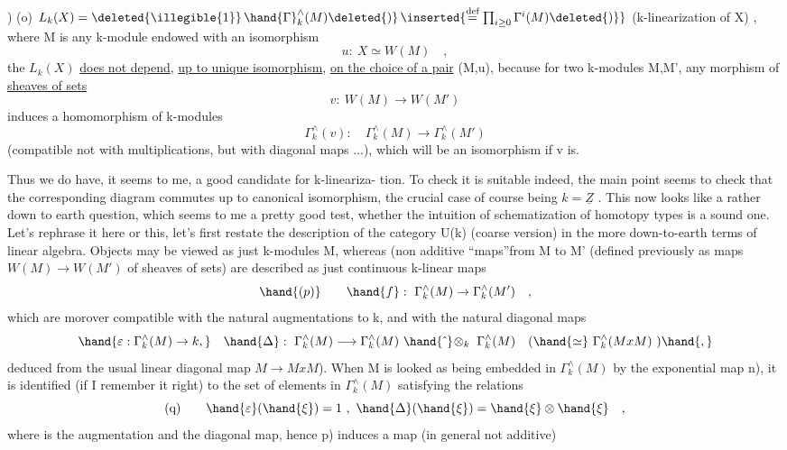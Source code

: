 
)
(o) \qquad $L_k(X) = \deleted{\illegible{1}}\,\hand{\Gamma}_k^{\wedge}(M)\deleted{)}\,\inserted{\overset{\text{def}}{=}\prod_{i\geq 0}\Gamma^{i}(M)\deleted{)}}$ \hand{(}(k-linearization of X) ,
where M is any k-module endowed with an isomorphism
\[ u:\ X \simeq W(M) \quad , \]
the   $L_k(X)$ \uline{does not depend}, \uline{up to unique isomorphism}, \uline{on the
choice of a pair} (M,u), because  for two k-modules M,M', any
morphism of \uline{sheaves of sets}
\[ v:\ W(M) \longrightarrow W(M') \]
induces a  homomorphism of k-modules
\[ \Gamma_k^{\wedge}(v):\quad \Gamma_k^{\wedge}(M) \longrightarrow \Gamma_k^{\wedge}(M') \]
(compatible not with multiplications, but with diagonal maps ...), 
which will be an isomorphism if v is.

Thus we do have, it seems to me, a good candidate for k-lineariza-%
tion. To check it is suitable indeed, the main point seems to check
that the corresponding diagram  commutes up to canonical isomorphism,
the crucial case of course being $k=\underline{Z}$ . This now looks like a rather down
to earth question, which seems to me a pretty good test, whether the
intuition of schematization of homotopy types is a sound one. Let's
rephrase it here or this, let's first restate the 
description of the  category U(k) (coarse version) in the more
down-to-earth terms of linear algebra. Objects may be viewed as just
k-modules M, whereas  (non additive\hand{)} ``maps''from M to M' (defined
previously as maps $W(M)\longrightarrow W(M')$ of sheaves of sets) are described as
just continuous k-linear maps
\[ \hand{(p)} \qquad \hand{f}:\ \Gamma_k^{\wedge}(M) \rightarrow \Gamma_k^{\wedge}(M') \quad , \]
which are morover compatible with the natural augmentations to k,
and with the natural diagonal maps \unsure{\hand{:}|;}
\[ \hand{\varepsilon:\Gamma_k^{\wedge}(M)\rightarrow k,}\quad \hand{\Delta}:\ \Gamma_k^{\wedge}(M)\longrightarrow \Gamma_k^{\wedge}(M)\ \hand{\hat{\ }}\!\otimes_k\ \Gamma_k^{\wedge}(M) \quad (\hand{\simeq}\ \Gamma_k^{\wedge}(MxM)\ )\hand{,} \]
 \deleted{(}deduced from the usual linear diagonal map $M\rightarrow MxM$). When M is
looked  as being embedded in $\Gamma_k^{\wedge}(M)$ by the exponential map \hand{(}n),
it is identified (if I remember it right) to the set of elements \inserted{$\xi$} in
$\Gamma_k^{\wedge}(M)$ satisfying the relations
\[ \text{(q)} \qquad \hand{\varepsilon}(\hand{\xi}) = 1 \ ,\ \hand{\Delta}(\hand{\xi}) = \hand{\xi}\otimes\hand{\xi} \quad , \]
where \hand{$\varepsilon$} is the augmentation and \hand{$\Delta$} the diagonal map, hence p) induces
a map (in general not additive)

